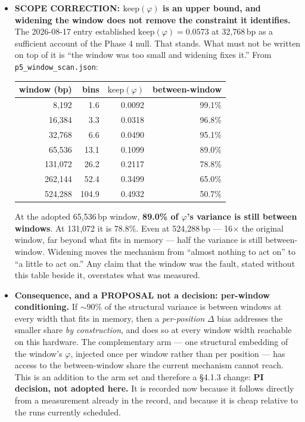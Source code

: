 \documentclass[11pt,a4paper]{article}
\newcommand{\code}[1]{\texttt{\small #1}}
\begin{document}
\begin{itemize}

\item \textbf{SCOPE CORRECTION: $\mathrm{keep}(\varphi)$ is an upper bound, and
widening the window does not remove the constraint it identifies.} The
2026-08-17 entry established $\mathrm{keep}(\varphi) = 0.0573$ at 32{,}768\,bp
as a sufficient account of the Phase 4 null. That stands. What must not be
written on top of it is ``the window was too small and widening fixes it.''
From \code{p5\_window\_scan.json}:

\begin{center}
\begin{tabular}{rrrr}
\toprule
window (bp) & bins & $\mathrm{keep}(\varphi)$ & between-window \\
\midrule
8{,}192   &   1.6 & 0.0092 & 99.1\% \\
16{,}384  &   3.3 & 0.0318 & 96.8\% \\
32{,}768  &   6.6 & 0.0490 & 95.1\% \\
65{,}536  &  13.1 & 0.1099 & 89.0\% \\
131{,}072 &  26.2 & 0.2117 & 78.8\% \\
262{,}144 &  52.4 & 0.3499 & 65.0\% \\
524{,}288 & 104.9 & 0.4932 & 50.7\% \\
\bottomrule
\end{tabular}
\end{center}

At the adopted 65{,}536\,bp window, \textbf{89.0\% of $\varphi$'s variance is
still between windows}. At 131{,}072 it is 78.8\%. Even at 524{,}288\,bp ---
16$\times$ the original window, far beyond what fits in memory --- half the
variance is still between-window. Widening moves the mechanism from
``almost nothing to act on'' to ``a little to act on.'' Any claim that the
window was the fault, stated without this table beside it, overstates what was
measured.

\item \textbf{Consequence, and a PROPOSAL not a decision: per-window
conditioning.} If ${\sim}90\%$ of the structural variance is between windows at
every width that fits in memory, then a \emph{per-position} $\Delta$ bias
addresses the smaller share \emph{by construction}, and does so at every window
width reachable on this hardware. The complementary arm --- one structural
embedding of the window's $\varphi$, injected once per window rather than per
position --- has access to the between-window share the current mechanism
cannot reach. This is an addition to the arm set and therefore a
\S4.1.3 change: \textbf{PI decision, not adopted here.} It is recorded now
because it follows directly from a measurement already in the record, and
because it is cheap relative to the runs currently scheduled.


\end{itemize}
\end{document}
